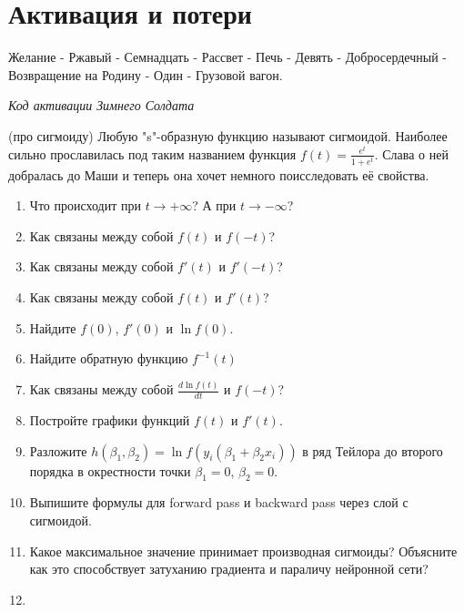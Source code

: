 
\section*{Активация и потери} 

\epigraph{Желание - Ржавый - Семнадцать - Рассвет - Печь - Девять - Добросердечный - Возвращение на Родину - Один - Грузовой вагон.}{\textit{Код активации Зимнего Солдата}}

\begin{problem}{(про сигмоиду)}
Любую "s"-образную функцию называют сигмоидой. Наиболее сильно прославилась под таким названием функция $f(t) = \frac{e^t}{1 + e^t}.$ Слава о ней добралась до Маши и теперь она хочет немного поисследовать её свойства. 

\begin{enumerate}
	\item Что происходит при $t \to +\infty$? А при $t \to -\infty$?
	\item Как связаны между собой $f(t)$ и  $f(-t)$?
	\item Как связаны между собой $f'(t)$ и  $f'(-t)$?
	\item Как связаны между собой $f(t)$ и $f'(t)$? 
	\item Найдите $f(0)$, $f'(0)$ и $\ln f(0)$.
	\item Найдите обратную функцию $f^{-1}(t)$
	\item Как связаны между собой $\frac{d\ln f(t)}{dt}$ и $f(-t)$?
	\item Постройте графики функций $f(t)$ и $f'(t)$.
	\item Разложите $h(\beta_1, \beta_2)=\ln f(y_i(\beta_1 + \beta_2 x_i))$ в ряд Тейлора до второго порядка в окрестности точки $\beta_1=0$, $\beta_2=0$.
	\item Выпишите формулы для forward pass и backward pass через слой с сигмоидой. 
	\item Какое максимальное значение принимает производная сигмоиды? Объясните как это способствует затуханию градиента и параличу нейронной сети?  
	\item {}
	\end{enumerate}
\end{problem} 

